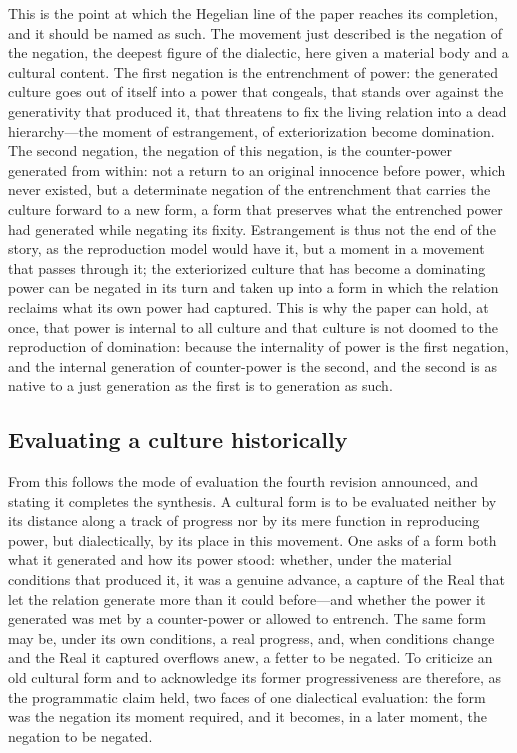 This is the point at which the Hegelian line of the paper reaches its completion, and it should be named as such. The movement just described is the negation of the negation, the deepest figure of the dialectic, here given a material body and a cultural content. The first negation is the entrenchment of power: the generated culture goes out of itself into a power that congeals, that stands over against the generativity that produced it, that threatens to fix the living relation into a dead hierarchy---the moment of estrangement, of exteriorization become domination. The second negation, the negation of this negation, is the counter-power generated from within: not a return to an original innocence before power, which never existed, but a determinate negation of the entrenchment that carries the culture forward to a new form, a form that preserves what the entrenched power had generated while negating its fixity. Estrangement is thus not the end of the story, as the reproduction model would have it, but a moment in a movement that passes through it; the exteriorized culture that has become a dominating power can be negated in its turn and taken up into a form in which the relation reclaims what its own power had captured. This is why the paper can hold, at once, that power is internal to all culture and that culture is not doomed to the reproduction of domination: because the internality of power is the first negation, and the internal generation of counter-power is the second, and the second is as native to a just generation as the first is to generation as such.

\subsection*{Evaluating a culture historically}

From this follows the mode of evaluation the fourth revision announced, and stating it completes the synthesis. A cultural form is to be evaluated neither by its distance along a track of progress nor by its mere function in reproducing power, but dialectically, by its place in this movement. One asks of a form both what it generated and how its power stood: whether, under the material conditions that produced it, it was a genuine advance, a capture of the Real that let the relation generate more than it could before---and whether the power it generated was met by a counter-power or allowed to entrench. The same form may be, under its own conditions, a real progress, and, when conditions change and the Real it captured overflows anew, a fetter to be negated. To criticize an old cultural form and to acknowledge its former progressiveness are therefore, as the programmatic claim held, two faces of one dialectical evaluation: the form was the negation its moment required, and it becomes, in a later moment, the negation to be negated.

